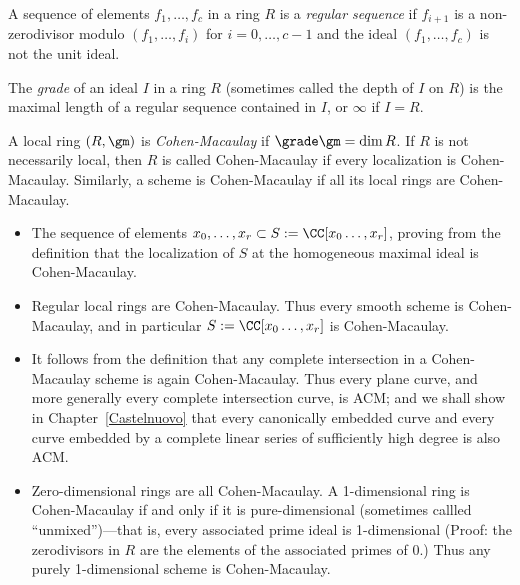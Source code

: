 \begin{definition}\label{gradeDef}
A sequence of elements $f_{1}, \dots, f_{c}$ in a ring $R$ is a \emph{regular sequence} if
$f_{i+1}$ is a non-zerodivisor modulo $(f_{1}, \dots, f_{i})$ for $i = 0,\dots, c-1$ and the ideal
$(f_{1}, \dots, f_{c})$ is not the unit ideal. 

The \emph{grade} of an ideal $I$ in a ring  $R$ (sometimes called the depth of $I$ on $R$) is the maximal length of a regular sequence contained in $I$, or $\infty$ if $I = R$. 

A local ring $(R,\gm)$ is \emph{Cohen-Macaulay} if $\grade \gm = \dim R$. If $R$ is not necessarily local, then 
$R$ is called Cohen-Macaulay if every localization is Cohen-Macaulay. Similarly, a scheme is Cohen-Macaulay if
all its local rings are Cohen-Macaulay.
\end{definition}

\begin{example}
\begin{itemize}
 \item The sequence of elements $x_{0},\dots, x_{r}\subset S:= \CC[x_{0}\dots, x_{r}]$, proving
 from the definition that the localization of $S$ at the homogeneous maximal ideal is Cohen-Macaulay.
 
 \item Regular local rings are Cohen-Macaulay. Thus every smooth scheme is Cohen-Macaulay, and in particular
$S:= \CC[x_{0}\dots, x_{r}]$ is Cohen-Macaulay. 
 
 \item It follows from the definition that any complete intersection in a Cohen-Macaulay scheme is again Cohen-Macaulay.
Thus every plane curve, and more generally every complete intersection curve,
is ACM; and we shall show in Chapter~\ref{Castelnuovo} that every canonically embedded curve
and every curve embedded by a complete linear series of sufficiently high degree is also ACM.

\item Zero-dimensional rings are all Cohen-Macaulay. A 1-dimensional ring is Cohen-Macaulay if and only if
it is pure-dimensional (sometimes callled ``unmixed'')---that is, 
every associated prime ideal is 1-dimensional (Proof: the zerodivisors in $R$ are the elements of the associated primes of 0.) Thus any purely 1-dimensional scheme is Cohen-Macaulay. 

\end{itemize}

\end{example}

